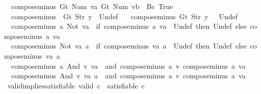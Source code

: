 \begin{isabellebody}
\ \ {\isachardoublequoteopen}compose{\isacharunderscore}minus\ {\isacharparenleft}Gt\ {\isacharparenleft}Num\ va{\isacharparenright}{\isacharparenright}\ {\isacharparenleft}Gt\ {\isacharparenleft}Num\ vb{\isacharparenright}{\isacharparenright}\ {\isacharequal}\ Bc\ True{\isachardoublequoteclose}\ {\isacharbar}\isanewline
\ \ {\isachardoublequoteopen}compose{\isacharunderscore}minus\ {\isacharunderscore}\ {\isacharparenleft}Gt\ {\isacharparenleft}Str\ y{\isacharparenright}{\isacharparenright}\ {\isacharequal}\ Undef{\isachardoublequoteclose}\ {\isacharbar}\isanewline
\ \ {\isachardoublequoteopen}compose{\isacharunderscore}minus\ {\isacharparenleft}Gt\ {\isacharparenleft}Str\ y{\isacharparenright}{\isacharparenright}\ {\isacharunderscore}\ {\isacharequal}\ Undef{\isachardoublequoteclose}\ {\isacharbar}\isanewline
\ \ {\isachardoublequoteopen}compose{\isacharunderscore}minus\ a\ {\isacharparenleft}Not\ va{\isacharparenright}\ {\isacharequal}\ {\isacharparenleft}if\ {\isacharparenleft}compose{\isacharunderscore}minus\ a\ va{\isacharparenright}\ {\isacharequal}\ Undef\ then\ Undef\ else\ {\isacharparenleft}compose{\isacharunderscore}minus\ a\ va{\isacharparenright}{\isacharparenright}{\isachardoublequoteclose}\ {\isacharbar}\isanewline
\ \ {\isachardoublequoteopen}compose{\isacharunderscore}minus\ {\isacharparenleft}Not\ va{\isacharparenright}\ a\ {\isacharequal}\ {\isacharparenleft}if\ {\isacharparenleft}compose{\isacharunderscore}minus\ va\ a{\isacharparenright}\ {\isacharequal}\ Undef\ then\ Undef\ else\ {\isacharparenleft}compose{\isacharunderscore}minus\ va\ a{\isacharparenright}{\isacharparenright}{\isachardoublequoteclose}\ {\isacharbar}\isanewline
\ \ {\isachardoublequoteopen}compose{\isacharunderscore}minus\ a\ {\isacharparenleft}And\ v\ va{\isacharparenright}\ {\isacharequal}\ and\ {\isacharparenleft}compose{\isacharunderscore}minus\ a\ v{\isacharparenright}\ {\isacharparenleft}compose{\isacharunderscore}minus\ a\ va{\isacharparenright}{\isachardoublequoteclose}\ {\isacharbar}\isanewline
\ \ {\isachardoublequoteopen}compose{\isacharunderscore}minus\ {\isacharparenleft}And\ v\ va{\isacharparenright}\ a\ {\isacharequal}\ and\ {\isacharparenleft}compose{\isacharunderscore}minus\ a\ v{\isacharparenright}\ {\isacharparenleft}compose{\isacharunderscore}minus\ a\ va{\isacharparenright}{\isachardoublequoteclose}\isanewline
\isanewline
{}\isamarkupfalse%
\ valid{\isacharunderscore}implies{\isacharunderscore}satisfiable{\isacharcolon}\ {\isachardoublequoteopen}valid\ c\ {\isasymLongrightarrow}\ satisfiable\ c{\isachardoublequoteclose}\isanewline

\end{isabellebody}
